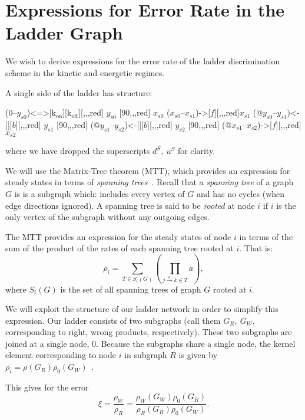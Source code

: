 \section{Expressions for Error Rate in the Ladder Graph}
\label{app:ladder_error}
We wish to derive expressions for the error rate of the ladder discrimination scheme in the kinetic and energetic regimes.

A single side of the ladder has structure:
\begin{center}
 \arrow(0--$y_{s0}$){<=>[$\mathrm{k_{on}}$][$\mathrm{k_{off}}$]}[,,,red] $y_{s0}$
\arrow{<=>[$u$][$d$]}[90,,,red] 
$x_{s0}$ \arrow($x_{s0}$--$x_{s1}$){->[$f$]}[,,,red]$x_{s1}$
\arrow(@$y_{s0}$--$y_{s1}$){<-[][$b$]}[,,,red] $y_{s1}$ \arrow{<=>[$u$][$d$]}[90,,,red]
\arrow(@$y_{s1}$--$y_{s2}$){<-[][$b$]}[,,,red] $y_{s2}$
\arrow{<=>[$u$][$d$]}[90,,,red] 
\arrow(@$x_{s1}$--$x_{s2}$){->[$f$]}[,,,red] $x_{s2}$
\schemestop
\end{center}
where we have dropped the superscripts $d^S, \ u^S$ for clarity.

We will use the Matrix-Tree theorem (MTT), which provides an expression for steady states in terms of {\it spanning trees}~\cite{Wong2018}.  Recall that a {\it spanning tree} of a graph $G$ is is a subgraph which: includes every vertex of $G$ and has no cycles (when edge directions ignored).  A spanning tree is said to be {\it rooted} at node $i$ if $i$ is the only vertex of the subgraph without any outgoing edges.

The MTT provides an expression for the steady states of node $i$ in terms of the sum of the product of the rates of each spanning tree rooted at $i$.  That is:
\[
\rho_i = \sum_{T\in S_i(G) }\left(\prod_{j\stackrel{a}{\to} k\in T}a \right),
\]
where $S_i(G)$ is the set of all spanning trees of graph $G$ rooted at $i$.

We will exploit the structure of our ladder network in order to simplify this expression.  Our ladder consists of two subgraphs (call them $G_R, \ G_W,$ corresponding to right, wrong products, respectively).  These two subgraphs are joined at a single node, $0.$  Because the subgraphs share a single node, the kernel element corresponding to node $i$ in subgraph $R$ is given by $\rho_i = \rho(G_R)\rho_0(G_W)$~\cite{Wong2018}.

This gives for the error
\begin{equation}\label{jer_span}
\xi = \frac{\rho_W}{\rho_R} = \frac{\rho_W(G_W)\rho_0(G_R)}{\rho_R(G_R)\rho_0(G_W)}.
\end{equation}

